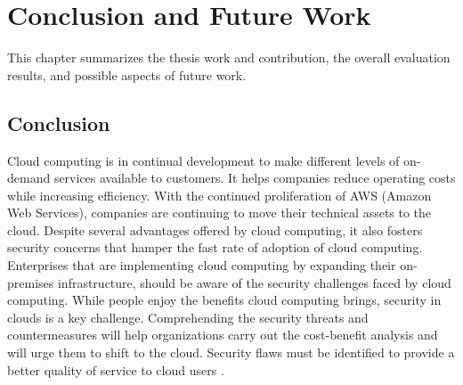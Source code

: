 
\chapter{Conclusion and Future Work}

\par This chapter summarizes the thesis work and contribution, the overall evaluation results, and possible aspects of future work.

\section{Conclusion}

\par Cloud computing is in continual development to make different levels of on-demand services available to customers. It helps companies reduce operating costs while increasing efficiency. With the continued proliferation of AWS (Amazon Web Services), companies are continuing to move their technical assets to the cloud. Despite several advantages offered by cloud computing, it also fosters security concerns that hamper the fast rate of adoption of cloud computing. Enterprises that are implementing cloud computing by expanding their on-premises infrastructure, should be aware of the security challenges faced by cloud computing. While people enjoy the benefits cloud computing brings, security in clouds is a key challenge. Comprehending the security threats and countermeasures will help organizations carry out the cost-benefit analysis and will urge them to shift to the cloud. Security flaws must be identified to provide a better quality of service to cloud users \cite{6}.

